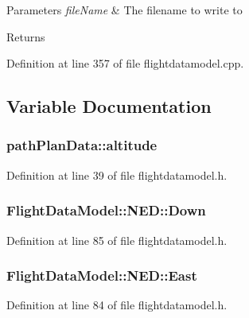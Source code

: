 \begin{DoxyParams}{Parameters}
{\em file\-Name} & The filename to write to \\
\hline
\end{DoxyParams}
\begin{DoxyReturn}{Returns}

\end{DoxyReturn}


Definition at line 357 of file flightdatamodel.\-cpp.



\subsection{Variable Documentation}
\hypertarget{group___path_ga6684fc7c8c169232f70b43e4fedc6eb0}{
\subsubsection[{altitude}]{ path\-Plan\-Data\-::altitude}}\label{group___path_ga6684fc7c8c169232f70b43e4fedc6eb0}


Definition at line 39 of file flightdatamodel.\-h.

\hypertarget{group___path_gae7f07300d5df11f628d4be7fefddce05}{
\subsubsection[{Down}]{ Flight\-Data\-Model\-::\-N\-E\-D\-::\-Down}}\label{group___path_gae7f07300d5df11f628d4be7fefddce05}


Definition at line 85 of file flightdatamodel.\-h.

\hypertarget{group___path_ga61ad0d9a38807fe21d456dc84cdb80d7}{
\subsubsection[{East}]{ Flight\-Data\-Model\-::\-N\-E\-D\-::\-East}}\label{group___path_ga61ad0d9a38807fe21d456dc84cdb80d7}


Definition at line 84 of file flightdatamodel.\-h.

